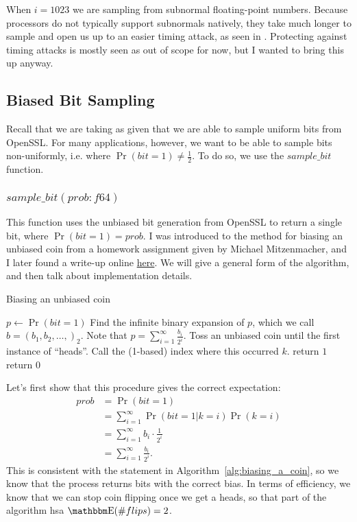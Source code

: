 \documentclass[11pt]{scrartcl} %
\begin{document}
When $i=1023$ we are sampling from subnormal floating-point numbers. Because processors do not typically support
subnormals natively, they take much longer to sample and open us up to an easier timing attack, as
seen in \cite{AKM+15}.
Protecting against timing attacks is mostly seen as out of scope for now, but I wanted
to bring this up anyway.

\subsection{Biased Bit Sampling}
Recall that we are taking as given that we are able to sample uniform bits from OpenSSL.
For many applications, however, we want to be able to sample bits non-uniformly,
i.e. where $\Pr(bit = 1) \neq \frac{1}{2}$. To do so, we use the $sample\_bit$ function.

\subsubsection{$sample\_bit(prob: f64)$}
This function uses the unbiased bit generation from OpenSSL to return a single bit, where $\Pr(bit = 1) = prob$.
I was introduced to the method for biasing an unbiased coin from a homework assignment given by Michael Mitzenmacher,
and I later found a write-up online \href{https://amakelov.wordpress.com/2013/10/10/arbitrarily-biasing-a-coin-in-2-expected-tosses/}{here}.
We will give a general form of the algorithm, and then talk about implementation details.
\begin{algorithm}[H]
	\caption{Biasing an unbiased coin}
	\label{alg:biasing_a_coin}
	\begin{algorithmic}[1]
		\State $p \gets \Pr(bit = 1)$
		\State Find the infinite binary expansion of $p$, which we call $b = (b_1, b_2, \hdots,)_2$.
		Note that $p = \sum_{i=1}^{\infty}\frac{b_i}{2^i}$.
		\State Toss an unbiased coin until the first instance of ``heads''. Call the (1-based) index where this occurred $k$.
			\State return $1$
		\Else
			\State return $0$
		\EndIf
	\end{algorithmic}
\end{algorithm}
Let's first show that this procedure gives the correct expectation:
\begin{align*}
	prob &= \Pr(bit = 1) \\
		 &= \sum_{i=1}^{\infty} \Pr(bit = 1 \vert k = i) \Pr(k = i) \\
		 &= \sum_{i=1}^{\infty} b_i \cdot \frac{1}{2^i} \\
		 &= \sum_{i=1}^{\infty}\frac{b_i}{2^i}.
\end{align*}
This is consistent with the statement in Algorithm~\ref{alg:biasing_a_coin}, so we know that
the process returns bits with the correct bias.
In terms of efficiency, we know that we can stop coin flipping once we get a heads,
so that part of the algorithm hsa $\E(\# flips) = 2$. \newline
\end{document}
